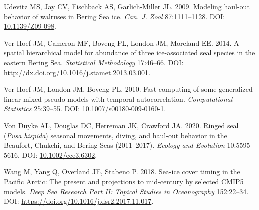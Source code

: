 \documentclass[fleqn,10pt,lineno]{wlpeerj} %
\newlength{\cslhangindent}
\newlength{\cslentryspacingunit} %
\newenvironment{CSLReferences}[2] %
 {%
  \setlength{\parindent}{0pt}
  \ifodd #1
  \let\oldpar\par
  \def\par{\hangindent=\cslhangindent\oldpar}
  \fi
  \setlength{\parskip}{#2\cslentryspacingunit}
 }%
 {}
\begin{document}
\begin{CSLReferences}{1}{0}
\leavevmode{}%
Udevitz MS, Jay CV, Fischback AS, Garlich-Miller JL. 2009. Modeling haul-out behavior of walruses in Bering Sea ice. \emph{Can. J. Zool} 87:1111--1128. DOI: \href{https://doi.org/10.1139/Z09-098}{10.1139/Z09-098}.

\leavevmode{}%
Ver Hoef JM, Cameron MF, Boveng PL, London JM, Moreland EE. 2014. A spatial hierarchical model for abundance of three ice-associated seal species in the eastern Bering Sea. \emph{Statistical Methodology} 17:46--66. DOI: \url{http://dx.doi.org/10.1016/j.stamet.2013.03.001}.

\leavevmode{}%
Ver Hoef JM, London JM, Boveng PL. 2010. Fast computing of some generalized linear mixed pseudo-models with temporal autocorrelation. \emph{Computational Statistics} 25:39--55. DOI: \href{https://doi.org/10.1007/s00180-009-0160-1}{10.1007/s00180-009-0160-1}.

\leavevmode{}%
Von Duyke AL, Douglas DC, Herreman JK, Crawford JA. 2020. Ringed seal (\emph{Pusa hispida}) seasonal movements, diving, and haul-out behavior in the Beaufort, Chukchi, and Bering Seas (2011--2017). \emph{Ecology and Evolution} 10:5595--5616. DOI: \href{https://doi.org/10.1002/ece3.6302}{10.1002/ece3.6302}.

\leavevmode{}%
Wang M, Yang Q, Overland JE, Stabeno P. 2018. Sea-ice cover timing in the Pacific Arctic: The present and projections to mid-century by selected CMIP5 models. \emph{Deep Sea Research Part II: Topical Studies in Oceanography} 152:22--34. DOI: \url{https://doi.org/10.1016/j.dsr2.2017.11.017}.

\end{CSLReferences}
\end{document}
